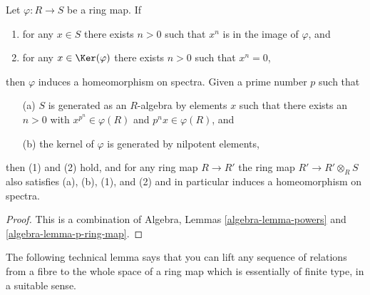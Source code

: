 \begin{lemma}
\label{lemma-p-ring-map}
Let $\varphi : R \to S$ be a ring map. If
\begin{enumerate}
\item for any $x \in S$ there exists $n > 0$ such that
$x^n$ is in the image of $\varphi$, and
\item for any $x \in \Ker(\varphi)$ there exists $n > 0$
such that $x^n = 0$,
\end{enumerate}
then $\varphi$ induces a homeomorphism on spectra. Given a
prime number $p$ such that
\begin{enumerate}
\item[(a)] $S$ is generated as an $R$-algebra by elements $x$ such
that there exists an $n > 0$ with $x^{p^n} \in \varphi(R)$ and
$p^nx \in \varphi(R)$, and
\item[(b)] the kernel of $\varphi$ is generated by nilpotent elements,
\end{enumerate}
then (1) and (2) hold, and for any ring map $R \to R'$
the ring map $R' \to R' \otimes_R S$ also satisfies (a), (b), (1), and (2)
and in particular induces a homeomorphism on spectra.
\end{lemma}

\begin{proof}
This is a combination of
Algebra, Lemmas \ref{algebra-lemma-powers} and
\ref{algebra-lemma-p-ring-map}.
\end{proof}

\noindent
The following technical lemma says that you can lift any sequence
of relations from a fibre to the whole space of a ring
map which is essentially of finite type, in a suitable sense.

